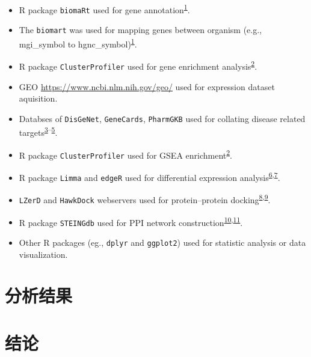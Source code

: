 \documentclass[
]{article}
\providecommand{\tightlist}{%
  \setlength{\itemsep}{0pt}\setlength{\parskip}{0pt}}
\begin{document}
\begin{itemize}
\tightlist
\item
  R package \texttt{biomaRt} used for gene annotation\textsuperscript{\protect\hyperlink{ref-MappingIdentifDurinc2009}{1}}.
\item
  The \texttt{biomart} was used for mapping genes between organism (e.g., mgi\_symbol to hgnc\_symbol)\textsuperscript{\protect\hyperlink{ref-MappingIdentifDurinc2009}{1}}.
\item
  R package \texttt{ClusterProfiler} used for gene enrichment analysis\textsuperscript{\protect\hyperlink{ref-ClusterprofilerWuTi2021}{2}}.
\item
  GEO \url{https://www.ncbi.nlm.nih.gov/geo/} used for expression dataset aquisition.
\item
  Databses of \texttt{DisGeNet}, \texttt{GeneCards}, \texttt{PharmGKB} used for collating disease related targets\textsuperscript{\protect\hyperlink{ref-TheDisgenetKnPinero2019}{3}--\protect\hyperlink{ref-PharmgkbAWorBarbar2018}{5}}.
\item
  R package \texttt{ClusterProfiler} used for GSEA enrichment\textsuperscript{\protect\hyperlink{ref-ClusterprofilerWuTi2021}{2}}.
\item
  R package \texttt{Limma} and \texttt{edgeR} used for differential expression analysis\textsuperscript{\protect\hyperlink{ref-LimmaPowersDiRitchi2015}{6},\protect\hyperlink{ref-EdgerDifferenChen}{7}}.
\item
  \texttt{LZerD} and \texttt{HawkDock} webservers used for protein--protein docking\textsuperscript{\protect\hyperlink{ref-LzerdWebserverChrist2021}{8},\protect\hyperlink{ref-HawkdockAWebWeng2019}{9}}.
\item
  R package \texttt{STEINGdb} used for PPI network construction\textsuperscript{\protect\hyperlink{ref-TheStringDataSzklar2021}{10},\protect\hyperlink{ref-CytohubbaIdenChin2014}{11}}.
\item
  Other R packages (eg., \texttt{dplyr} and \texttt{ggplot2}) used for statistic analysis or data visualization.
\end{itemize}

\hypertarget{results}{%
\section{分析结果}\label{results}}

\hypertarget{dis}{%
\section{结论}\label{dis}}
\end{document}
